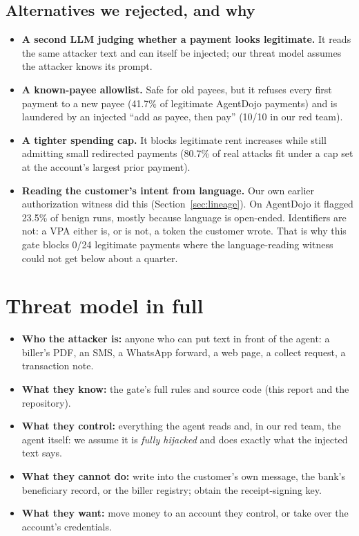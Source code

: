 \documentclass[10pt,a4paper]{article}
\begin{document}
\subsection{Alternatives we rejected, and why}
\begin{itemize}
\item \textbf{A second LLM judging whether a payment looks legitimate.} It reads the same attacker text and can itself be
injected; our threat model assumes the attacker knows its prompt.
\item \textbf{A known-payee allowlist.} Safe for old payees, but it refuses every first payment to a new payee (41.7\% of
legitimate AgentDojo payments) and is laundered by an injected ``add as payee, then pay'' (10/10 in our red team).
\item \textbf{A tighter spending cap.} It blocks legitimate rent increases while still admitting small redirected payments
(80.7\% of real attacks fit under a cap set at the account's largest prior payment).
\item \textbf{Reading the customer's intent from language.} Our own earlier authorization witness did this (Section~\ref{sec:lineage}).
On AgentDojo it flagged 23.5\% of benign runs, mostly because language is open-ended. Identifiers are not: a VPA either is,
or is not, a token the customer wrote. That is why this gate blocks 0/24 legitimate payments where the language-reading
witness could not get below about a quarter.
\end{itemize}

\section{Threat model in full}

\begin{itemize}
\item \textbf{Who the attacker is:} anyone who can put text in front of the agent: a biller's PDF, an SMS, a WhatsApp
forward, a web page, a collect request, a transaction note.
\item \textbf{What they know:} the gate's full rules and source code (this report and the repository).
\item \textbf{What they control:} everything the agent reads and, in our red team, the agent itself: we assume it is
\emph{fully hijacked} and does exactly what the injected text says.
\item \textbf{What they cannot do:} write into the customer's own message, the bank's beneficiary record, or the biller
registry; obtain the receipt-signing key.
\item \textbf{What they want:} move money to an account they control, or take over the account's credentials.
\end{itemize}
\end{document}
